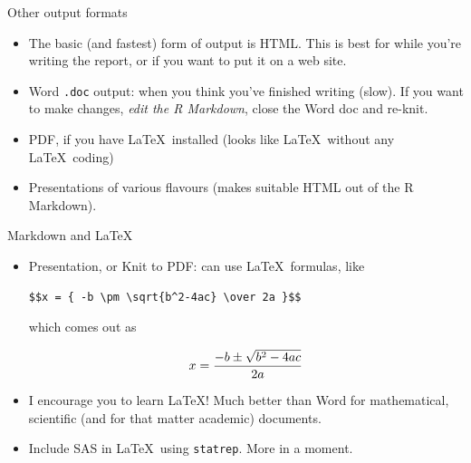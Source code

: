 \documentclass[unknownkeysallowed]{beamer}\usepackage[]{graphicx}\usepackage[]{color}
\begin{document}
\begin{frame}[fragile]{Other output formats}
  
  \begin{itemize}
  \item The basic (and fastest) form of output is HTML. This is best
    for while you're writing the report, or if you want to put it on a
    web site.
  \item Word \texttt{.doc} output: when you think you've finished
    writing (slow). If you want to make changes, \emph{edit the R
      Markdown}, close the Word doc and re-knit.
  \item PDF, if you have \LaTeX\ installed (looks like \LaTeX\
    without any \LaTeX\ coding)
  \item Presentations of various flavours (makes suitable HTML out of
    the R Markdown).
  \end{itemize}
  
\end{frame}


\begin{frame}[fragile]{Markdown and \LaTeX}

  \begin{itemize}
\item Presentation, or Knit to PDF: can use
  \LaTeX\ formulas, like

\begin{verbatim}
$$x = { -b \pm \sqrt{b^2-4ac} \over 2a }$$
\end{verbatim}

which comes out as

$$x = { -b \pm \sqrt{b^2-4ac} \over 2a }$$


\item I encourage you to learn \LaTeX! Much better than Word for
  mathematical, scientific (and for that matter academic) documents.


\item Include SAS in \LaTeX\ using \texttt{statrep}. More in a moment.


  \end{itemize}
  
\end{frame}
\end{document}
